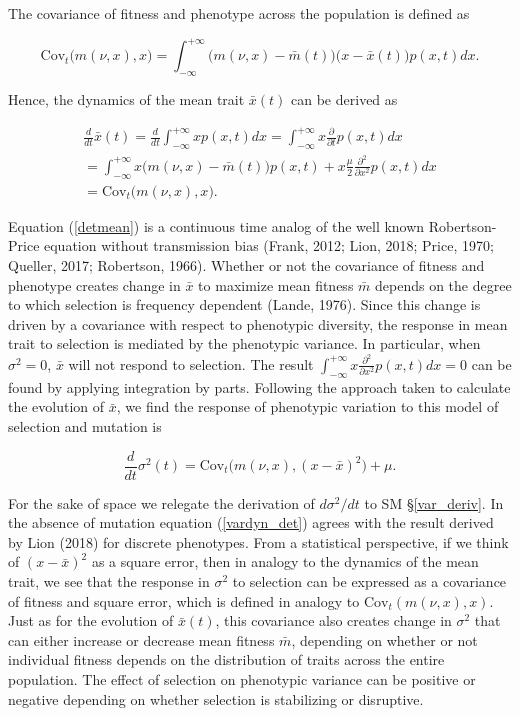 \documentclass[]{elsarticle} %
\begin{document}
The covariance of fitness and phenotype across the population is defined
as

\begin{equation}
\mathrm{Cov}_t\Big(m(\nu,x),x\Big)=\int_{-\infty}^{+\infty}\Big(m(\nu,x)-\bar m(t)\Big)\Big(x-\bar x(t)\Big)p(x,t)dx.
\end{equation}

Hence, the dynamics of the mean trait \(\bar x(t)\) can be derived as

\begin{multline}\label{detmean}
\frac{d}{dt}\bar x(t)=\frac{d}{dt}\int_{-\infty}^{+\infty} x p(x,t)dx=\int_{-\infty}^{+\infty} x\frac{\partial}{\partial t} p(x,t)dx \\
=\int_{-\infty}^{+\infty} x\big(m(\nu,x)-\bar m(t)\big) p(x,t)+x\frac{\mu}{2}\frac{\partial^2}{\partial x^2} p(x,t)dx \\
=\mathrm{Cov}_t\Big(m(\nu,x),x\Big).
\end{multline}

Equation (\ref{detmean}) is a continuous time analog of the well known
Robertson-Price equation without transmission bias (Frank, 2012; Lion,
2018; Price, 1970; Queller, 2017; Robertson, 1966). Whether or not the
covariance of fitness and phenotype creates change in \(\bar x\) to
maximize mean fitness \(\bar m\) depends on the degree to which
selection is frequency dependent (Lande, 1976). Since this change is
driven by a covariance with respect to phenotypic diversity, the
response in mean trait to selection is mediated by the phenotypic
variance. In particular, when \(\sigma^2=0\), \(\bar x\) will not
respond to selection. The result
\(\int_{-\infty}^{+\infty} x\frac{\partial^2}{\partial x^2} p(x,t)dx=0\)
can be found by applying integration by parts. Following the approach
taken to calculate the evolution of \(\bar x\), we find the response of
phenotypic variation to this model of selection and mutation is

\begin{equation}\label{vardyn_det}
\frac{d}{dt}\sigma^2(t)=\mathrm{Cov}_t\Big(m(\nu,x),(x-\bar x)^2\Big)+\mu.
\end{equation}

For the sake of space we relegate the derivation of \(d\sigma^2/dt\) to
SM \S\ref{var_deriv}. In the absence of mutation equation
(\ref{vardyn_det}) agrees with the result derived by Lion (2018) for
discrete phenotypes. From a statistical perspective, if we think of
\((x-\bar x)^2\) as a square error, then in analogy to the dynamics of
the mean trait, we see that the response in \(\sigma^2\) to selection
can be expressed as a covariance of fitness and square error, which is
defined in analogy to \(\mathrm{Cov}_t(m(\nu,x),x)\). Just as for the
evolution of \(\bar x(t)\), this covariance also creates change in
\(\sigma^2\) that can either increase or decrease mean fitness
\(\bar m\), depending on whether or not individual fitness depends on
the distribution of traits across the entire population. The effect of
selection on phenotypic variance can be positive or negative depending
on whether selection is stabilizing or disruptive.
\end{document}
